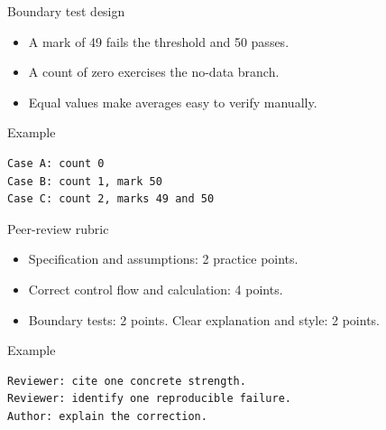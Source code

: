 \documentclass[10pt,aspectratio=169]{beamer}
\begin{document}
\begin{frame}[fragile,t]{Boundary test design}
\begin{itemize}
\item A mark of 49 fails the threshold and 50 passes.
\item A count of zero exercises the no-data branch.
\item Equal values make averages easy to verify manually.
\end{itemize}
\vspace{1mm}\begin{block}{Example}
\begin{lstlisting}
Case A: count 0
Case B: count 1, mark 50
Case C: count 2, marks 49 and 50
\end{lstlisting}
\end{block}
\end{frame}

\begin{frame}[fragile,t]{Peer-review rubric}
\begin{itemize}
\item Specification and assumptions: 2 practice points.
\item Correct control flow and calculation: 4 points.
\item Boundary tests: 2 points. Clear explanation and style: 2 points.
\end{itemize}
\vspace{1mm}\begin{block}{Example}
\begin{lstlisting}
Reviewer: cite one concrete strength.
Reviewer: identify one reproducible failure.
Author: explain the correction.
\end{lstlisting}
\end{block}
\end{frame}
\end{document}
